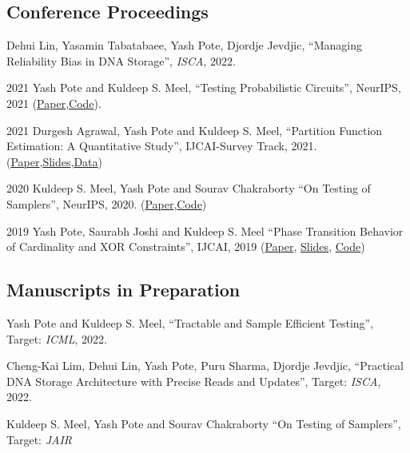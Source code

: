\documentclass[12pt,letterpaper]{report}
\begin{document}
    \subsection*{Conference Proceedings}

    \begin{tablist}       
    	\item[\the\year] \tab  Dehui Lin, Yasamin Tabatabaee, Yash Pote, Djordje Jevdjic, \enquote{Managing Reliability Bias in DNA Storage}, \textit{ISCA},  2022.
    			
    	\item[2021] \tab  Yash Pote  and Kuldeep S. Meel, \enquote{Testing Probabilistic Circuits},  {NeurIPS},  2021 (\href{https://www.comp.nus.edu.sg/~meel/Papers/neurips21-pm.pdf}{Paper},\href{https://github.com/meelgroup/teq}{Code}).
    	
    	\item[2021] \tab  Durgesh Agrawal, Yash Pote  and Kuldeep S. Meel, \enquote{Partition Function Estimation: A Quantitative Study}, IJCAI-Survey Track,  2021.(\href{https://arxiv.org/abs/2105.11132}{Paper},\href{https://meelgroup.github.io/publication/ijcai21_partition}{Slides},\href{https://doi.org/10.5281/zenodo.4769117}{Data})
    	
    	\item[2020] \tab Kuldeep S. Meel, Yash Pote  and Sourav Chakraborty \enquote{On Testing of Samplers}, NeurIPS, 2020. (\href{https://arxiv.org/abs/2010.12918}{Paper},\href{https://github.com/meelgroup/barbarik}{Code})
    	
    	
        \item[2019] \tab Yash Pote, Saurabh Joshi and Kuldeep S. Meel  \enquote{Phase Transition Behavior of Cardinality and
        XOR Constraints}, IJCAI, 2019 (\href{https://www.ijcai.org/proceedings/2019/0162.pdf}{Paper}, \href{https://meelgroup.github.io/files/slides/ijcai19pjm.pdf}{Slides}, \href{https://github.com/meelgroup/1-CARD-XOR/}{Code})
        

	
    \end{tablist}

    \subsection*{Manuscripts in Preparation}

    \begin{tablist}

		\item[\the\year] \tab  Yash Pote  and Kuldeep S. Meel, \enquote{Tractable and Sample Efficient Testing}, Target: \textit{ICML},  2022.
		
		\item[\the\year] \tab  Cheng-Kai Lim, Dehui Lin, Yash Pote,  Puru Sharma, Djordje Jevdjic, \enquote{Practical DNA Storage Architecture with Precise Reads and
			Updates}, Target: \textit{ISCA},  2022.
			
		\item[\the\year] \tab Kuldeep S. Meel, Yash Pote  and Sourav Chakraborty \enquote{On Testing of Samplers}, Target: \textit{JAIR}
	
    \end{tablist}
\end{document}
